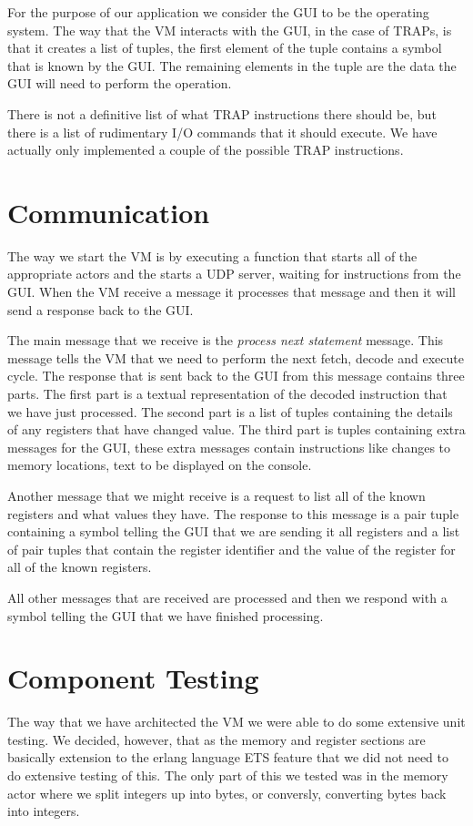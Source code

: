 \documentclass[a4paper,11pt]{report}
\begin{document}
For the purpose of our application we consider the GUI to be the operating system. The way that the VM interacts with the GUI, in the case of TRAPs, is that it creates a list of tuples, the first element of the tuple contains a symbol that is known by the GUI. The remaining elements in the tuple are the data the GUI will need to perform the operation.

There is not a definitive list of what TRAP instructions there should be, but there is a list of rudimentary I/O commands that it should execute. We have actually only implemented a couple of the possible TRAP instructions.
\section{Communication}
The way we start the VM is by executing a function that starts all of the appropriate actors and the starts a UDP server, waiting for instructions from the GUI. When the VM receive a message it processes that message and then it will send a response back to the GUI. 

The main message that we receive is the \textit{process next statement} message. This message tells the VM that we need to perform the next fetch, decode and execute cycle. The response that is sent back to the GUI from this message contains three parts. The first part is a textual representation of the decoded instruction that we have just processed. The second part is a list of tuples containing the details of any registers that have changed value. The third part is tuples containing extra messages for the GUI, these extra messages contain instructions like changes to memory locations, text to be displayed on the console.

Another message that we might receive is a request to list all of the known registers and what values they have. The response to this message is a pair tuple containing a symbol telling the GUI that we are sending it all registers and a list of pair tuples that contain the register identifier and the value of the register for all of the known registers.

All other messages that are received are processed and then we respond with a symbol telling the GUI that we have finished processing.
\section{Component Testing}
The way that we have architected the VM we were able to do some extensive unit testing. We decided, however, that as the memory and register sections are basically extension to the erlang language ETS feature that we did not need to do extensive testing of this. The only part of this we tested was in the memory actor where we split integers up into bytes, or conversly, converting bytes back into integers.
\end{document}
